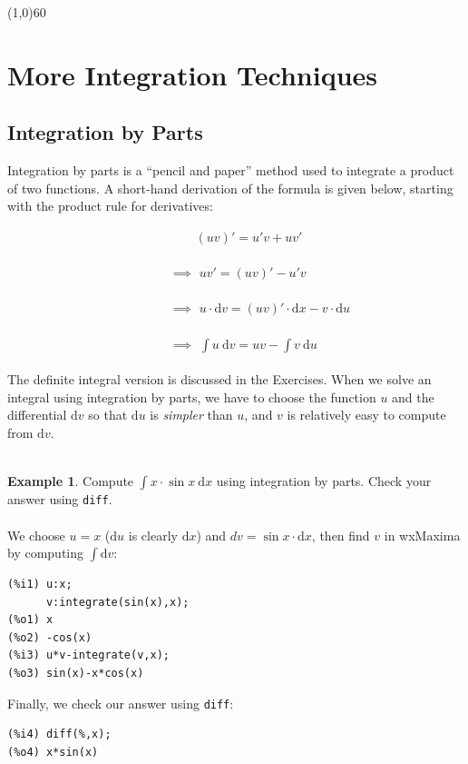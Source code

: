 \documentclass[10.5pt,twoside]{report}
\theoremstyle{definition}
\newtheorem{exmp}{Example}[section]
\begin{document}
\line(1,0){60}
\linethickness{0.5mm}
\pagebreak



\section{More Integration Techniques}\label{More Integration Techniques}


\subsection{Integration by Parts}

Integration by parts is a ``pencil and paper'' method used to integrate a product of two functions. A short-hand derivation of the formula is given below, starting with the product rule for derivatives:


\verb|                             |  $(uv)'=u'v+uv'$\\
${}$\\
\verb|                         |  $\implies$  $uv'=(uv)'-u'v$\\
${}$\\
\verb|                         |  $\implies$ 	 $u\cdot \mathrm{d}v=(uv)'\cdot \mathrm{d}x-v\cdot \mathrm{d}u$\\
${}$\\
\verb|                         |  $\implies$  $\displaystyle \int u\ \mathrm{d}v = uv - \displaystyle \int v\ \mathrm{d}u$\\
${}$\\

The definite integral version is discussed in the Exercises.  When we solve an integral using integration by parts, we have to choose the function $u$ and the differential $\mathrm{d}v$ so that $\mathrm{d}u$ is \textit{simpler} than $u$, and $v$ is relatively easy to compute from $\mathrm{d}v$.  \\
${}$\\


\begin{exmp}  Compute $\displaystyle \int x\cdot \sin{x}\ \mathrm{d}x$ using integration by parts.  Check your answer using \verb|diff|.\\
${}$\\
We choose $u=x$ ($\mathrm{d}u$ is clearly $\mathrm{d}x$) and $dv=\sin{x}\cdot \mathrm{d}x$, then find $v$ in wxMaxima by computing $\displaystyle \int  \mathrm{d}v$:

\begin{verbatim}
(%i1) u:x;
      v:integrate(sin(x),x);
(%o1) x
(%o2) -cos(x)
(%i3) u*v-integrate(v,x);
(%o3) sin(x)-x*cos(x)
\end{verbatim}

Finally, we check our answer using \verb|diff|:

\begin{verbatim}
(%i4) diff(%,x);
(%o4) x*sin(x)
\end{verbatim}

\end{exmp}
\end{document}
